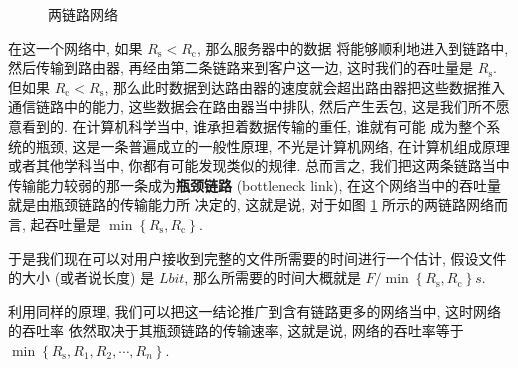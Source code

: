 \documentclass[10pt,UTF8]{book} %
\begin{document}
\begin{example}
\begin{figure}[H]
        \caption{两链路网络}
        \label{两链路网络}
    \end{figure}
    在这一个网络中, 如果 $R_\mathrm{s} < R_\mathrm{c}$, 那么服务器中的数据
    将能够顺利地进入到链路中, 然后传输到路由器, 再经由第二条链路来到客户这一边,
    这时我们的吞吐量是 $R_\mathrm{s}$. 但如果 $R_\mathrm{c} < R_\mathrm{s}$,
    那么此时数据到达路由器的速度就会超出路由器把这些数据推入通信链路中的能力,
    这些数据会在路由器当中排队, 然后产生丢包, 这是我们所不愿意看到的.
    在计算机科学当中, {\kaishu 谁承担着数据传输的重任, 谁就有可能
    成为整个系统的瓶颈}, 这是一条普遍成立的一般性原理, 不光是计算机网络,
    在计算机组成原理或者其他学科当中, 你都有可能发现类似的规律.
    总而言之, 我们把这两条链路当中传输能力较弱的那一条成为\textbf{瓶颈链路}
    (bottleneck link), 在这个网络当中的吞吐量就是由瓶颈链路的传输能力所
    决定的, 这就是说, 对于如图 \ref{两链路网络} 所示的两链路网络而言,
    起吞吐量是 $\min \left\{ R_\mathrm{s}, R_\mathrm{c} \right\}$.
    
    于是我们现在可以对用户接收到完整的文件所需要的时间进行一个估计, 假设文件的大小
    (或者说长度) 是 $L \si{bit}$, 那么所需要的时间大概就是 $F/\min \left\{
        R_\mathrm{s}, R_\mathrm{c}
    \right\} \si{s}$.

    利用同样的原理, 我们可以把这一结论推广到含有链路更多的网络当中, 这时网络的吞吐率
    依然取决于其瓶颈链路的传输速率, 这就是说, 网络的吞吐率等于
    $\min \left\{ R_\mathrm{s}, R_1, R_2, \cdots, R_n \right\}$.
    \begin{figure}[H]
        \centering




\end{figure}
\end{example}
\end{document}
